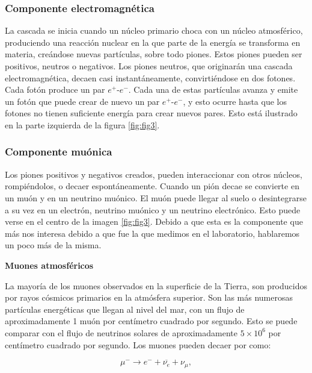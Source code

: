 \documentclass[a4paper,10pt]{article}
\numberwithin{equation}{section}
\begin{document}
\subsubsection{Componente electromagnética}

La cascada se inicia cuando un núcleo primario choca con un núcleo atmosférico, 
produciendo una reacción nuclear en la que parte de la energía se transforma en 
materia, creándose nuevas partículas, sobre todo piones. Estos piones pueden 
ser positivos, neutros o negativos. Los piones neutros, que originarán una 
cascada electromagnética, decaen casi instantáneamente, convirtiéndose 
en dos fotones. Cada fotón produce un par $e^+$-$e^-$. Cada una de estas partículas 
avanza y emite un fotón que puede crear de nuevo un par $e^+$-$e^-$, y esto ocurre 
hasta que los fotones no tienen suficiente energía para crear nuevos pares. Esto 
está ilustrado en la parte izquierda de la figura \eqref{fig:fig3}.

\subsubsection{Componente muónica}
\label{ss:componentemuonica}

Los piones positivos y negativos creados, pueden interaccionar con otros núcleos, 
rompiéndolos, o decaer espontáneamente. Cuando un pión decae se convierte en 
un muón y en un neutrino muónico. El muón puede llegar al suelo o desintegrarse 
a su vez en un electrón, neutrino muónico y un neutrino electrónico. Esto puede 
verse en el centro de la imagen \eqref{fig:fig3}. Debido a que esta es la componente 
que más nos interesa debido a que fue la que medimos en el laboratorio, hablaremos 
un poco más de la misma.

\vspace{.3cm}

\textbf{Muones atmosféricos}

\vspace{.3cm}

La mayoría de los muones observados en la superficie de la Tierra, son producidos 
por rayos cósmicos primarios en la atmósfera superior. Son las más numerosas 
partículas energéticas que llegan al nivel del mar, con un flujo de aproximadamente 
1 muón por centímetro cuadrado por segundo. Esto se puede comparar con el flujo de
neutrinos solares de aproximadamente $5\times 10^6$ por centímetro cuadrado por segundo. 
Los muones pueden decaer por como:

\begin{equation}
\mu^- \rightarrow e^- + \overline{\nu_e} + \nu_\mu,
\end{equation}
\end{document}
